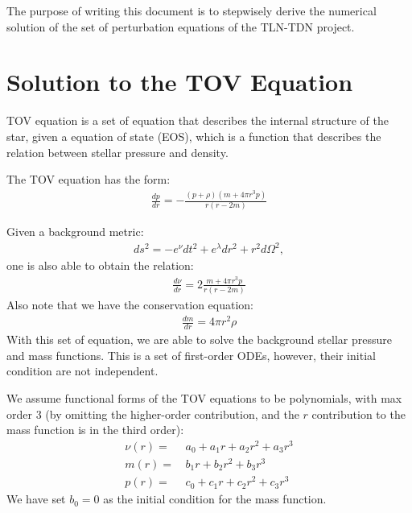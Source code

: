 \documentclass[10pt,oneside,headheight=10mm]{article}
\newcommand{\cb}[1]{\left(#1\right)}
\numberwithin{equation}{section}
\begin{document}
\begin{center}
\end{center}
The purpose of writing this document is to stepwisely derive the numerical solution of the set of perturbation equations of the TLN-TDN project.


\section{Solution to the TOV Equation}
TOV equation is a set of equation that describes the internal structure of the star, given a equation of state (EOS), which is a function that describes the relation between stellar pressure and density. 

The TOV equation has the form:
\begin{align}
    \frac{dp}{dr} = -\frac{\cb{p+\rho}\cb{m+4\pi r^3 p}}{r(r-2m)}
\end{align}

Given a background metric:
\begin{align}
    ds^2 = -e^\nu dt^2 + e^{\lambda} dr^2 + r^2d\Omega^2,\nonumber
\end{align}
one is also able to obtain the relation:
\begin{align}
    \frac{d\nu}{dr} = 2\frac{m+ 4\pi r^3 p}{r(r-2m)}
\end{align}
Also note that we have the conservation equation:
\begin{align}
    \frac{dm}{dr} = 4\pi r^2 \rho
\end{align}
With this set of equation, we are able to solve the background stellar pressure and mass functions. This is a set of first-order ODEs, however, their initial condition are not independent.

We assume functional forms of the TOV equations to be polynomials, with max order 3 (by omitting the higher-order contribution, and the $r$ contribution to the mass function is in the third order):
\begin{align}
    \nu(r) =&\, a_0 + a_1r + a_2r^2 + a_3r^3\\
    m(r) =&\, b_1r + b_2r^2 + b_3r^3\\
    p(r) =&\, c_0 + c_1r + c_2r^2 + c_3r^3
\end{align}
We have set $b_0 = 0$ as the initial condition for the mass function.
\end{document}
